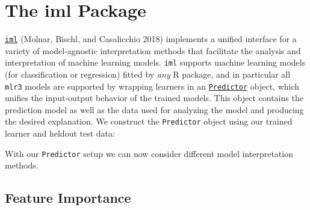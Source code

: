 \hypertarget{sec-iml}{%
\section{The iml Package}\label{sec-iml}}

\href{https://cran.r-project.org/package=iml}{\texttt{iml}}
(Molnar, Bischl, and Casalicchio 2018) implements a unified interface
for a variety of model-agnostic interpretation methods that facilitate
the analysis and interpretation of machine learning models. \texttt{iml}
supports machine learning models (for classification or regression)
fitted by \emph{any} R package, and in particular all \texttt{mlr3}
models are supported by wrapping learners in an
\href{https://www.rdocumentation.org/packages/iml/topics/Predictor}{\texttt{Predictor}}
object, which unifies the input-output behavior of the trained models.
This object contains the prediction model as well as the data used for
analyzing the model and producing the desired explanation. We construct
the \texttt{Predictor} object using our trained learner and heldout test
data:

\begin{Shaded}
\begin{Highlighting}[]

\OtherTok{=}\SpecialCharTok{$}\NormalTok{(}\SpecialCharTok{$}
  \SpecialCharTok{$}
\OtherTok{=}\SpecialCharTok{$}\NormalTok{(}\SpecialCharTok{$}
  \SpecialCharTok{$}

\OtherTok{=}\SpecialCharTok{$}
\end{Highlighting}
\end{Shaded}

With our \texttt{Predictor} setup we can now consider different model
interpretation methods.

\hypertarget{sec-feat-importance}{%
\subsection{\texorpdfstring{Feature
Importance}{Feature Importance}}\label{sec-feat-importance}}

